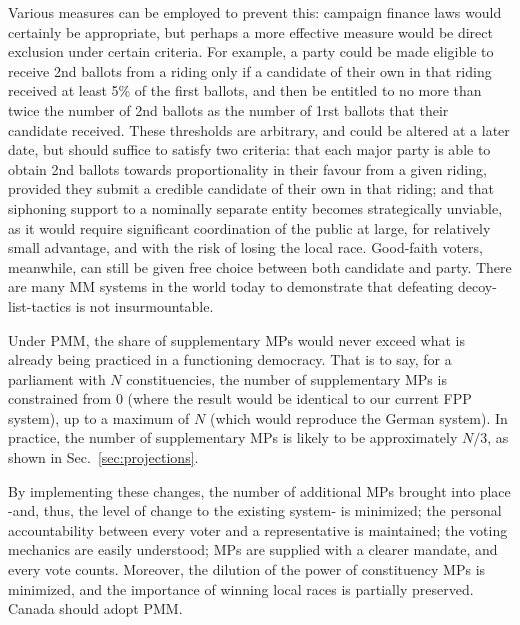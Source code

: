 \documentclass[DIV=calc, paper=a4, fontsize=11pt, twocolumn]{scrartcl}	 %
\begin{document}
Various measures can be employed to prevent this: campaign finance laws would certainly be appropriate, but perhaps a more  effective measure would be direct exclusion under certain criteria.
For example, a party could be made eligible to receive 2nd ballots from a riding only if a candidate of their own in that riding received at least 5\% of the first ballots, and then be entitled to no more than twice the number of 2nd ballots as the number of 1rst ballots that their candidate received. 
These thresholds are arbitrary, and could be altered at a later date, but should suffice to satisfy two criteria: that each major party is able to obtain 2nd ballots towards proportionality in their favour from a given riding, provided they submit a credible candidate of their own in that riding; and that siphoning support to a nominally separate entity becomes strategically unviable, as it would require significant coordination of the public at large, for relatively small advantage, and with the risk of losing the local race.
Good-faith voters, meanwhile, can still be given free choice between both candidate and party.
There are many MM systems in the world today to demonstrate that defeating decoy-list-tactics is not insurmountable.

Under PMM, the share of supplementary MPs would never exceed what is already being practiced in a functioning democracy. That is to say, for a parliament with $N$ constituencies, the number of supplementary MPs is constrained from 0 (where the result would be identical to our current FPP system), up to a maximum of $N$ (which would reproduce the German system). In practice, the number of supplementary MPs is likely to be approximately $N/3$, as shown in Sec.~\ref{sec:projections}.

By implementing these changes, the number of additional MPs brought into place \--and, thus, the level of change to the existing system\-- is minimized; the  personal accountability between every voter and a representative is maintained; the voting mechanics are easily understood; MPs are supplied with a clearer mandate, and every vote counts. 
Moreover, the dilution of the power of constituency MPs is minimized, and the importance of winning local races is partially preserved.
Canada should adopt PMM. 

\end{document}
